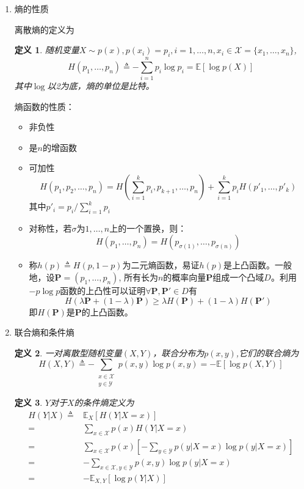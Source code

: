 \documentclass{article}
\newtheorem{definition}{定义}
\def\E{\mathbb{E}}
\begin{document}
\pagestyle{ch2}
\begin{enumerate}
\item 熵的性质

离散熵的定义为
\begin{definition}
随机变量$X\sim p(x),p(x_i)=p_i,i=1,\dots,n,x_i \in \mathcal{X}=\{x_1,\dots,x_n\}$,
$$
H(p_1,\dots,p_n)\triangleq -\sum_{i=1}^n p_i \log p_i = \E[\log p(X)]
$$
其中$\log$以2为底，熵的单位是比特。
\end{definition}
熵函数的性质：
\begin{itemize}
\item 非负性
\item 是$n$的增函数
\item 可加性 $$H(p_1,p_2,\dots,p_n)=H(\sum_{i=1}^k p_i,p_{k+1},\dots,p_n)+\sum_{i=1}^k p_i H(p'_1,\dots,p'_k)$$
其中$p'_i=p_i/\sum_{i=1}^k p_i$
\item 对称性，若$\sigma$为$1,\dots,n$上的一个置换，则：
$$H(p_1,\dots,p_n)=H(p_{\sigma(1)},\dots,p_{\sigma(n)}) $$
\item 称$h(p)\triangleq H(p,1-p)$为二元熵函数，易证$h(p)$是上凸函数。一般地，设$\textbf{P}=(p_1,\dots,p_n)$,
所有长为$n$的概率向量$\textbf{P}$组成一个凸域$D$。利用$-p\log p$函数的上凸性可以证明$\forall \textbf{P},\textbf{P}'\in D$有
$$H(\lambda \textbf{P}+(1-\lambda)\textbf{P})\geq \lambda H(\textbf{P})+(1-\lambda) H(\textbf{P}')$$
即$H(\textbf{P})$是$\textbf{P}$的上凸函数。
\end{itemize}
\item 联合熵和条件熵
\begin{definition}
一对离散型随机变量$(X,Y)$，联合分布为$p(x,y)$,它们的联合熵为
$$H(X,Y)\triangleq -\sum_{\substack{x\in \mathcal{X} \\ y\in \mathcal{Y}}} p(x,y)\log p(x,y) = -\E[\log p(X,Y)]$$
\end{definition}
\begin{definition}
$Y$对于$X$的条件熵定义为
\begin{align*}
H(Y|X)\triangleq & \E_X[H(Y|X=x)] \\
= & \sum_{x\in \mathcal{X}} p(x)H(Y|X=x)\\
= & \sum_{x\in \mathcal{X}} p(x)[-\sum_{y\in \mathcal Y}p(y|X=x)\log p(y|X=x)] \\
= & -\sum_{x\in \mathcal{X},y\in \mathcal{Y}} p(x,y)\log p(y|X=x)\\
= & -\E_{X,Y}[\log p(Y|X)]
\end{align*}
\end{definition}


\end{enumerate}
\end{document}
